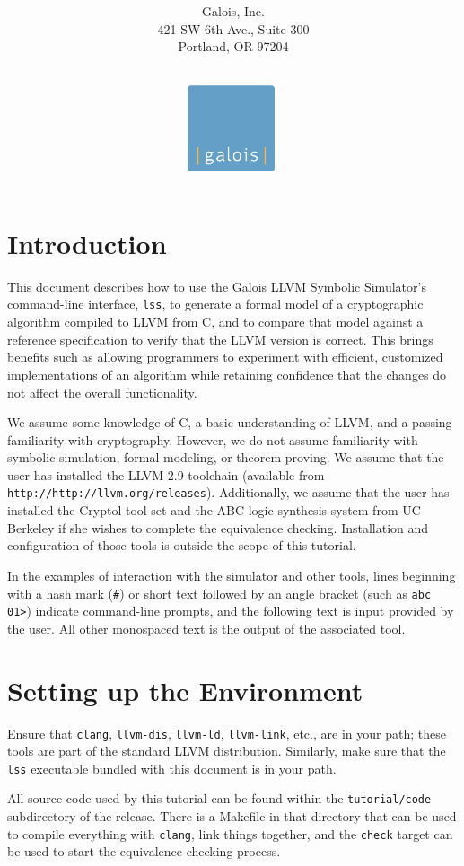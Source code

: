 \documentclass[11pt]{article}
\title{\LARGE{\bf \titleline}}
\author{\\$ $\\$ $\\
        Galois, Inc.\\
        421 SW 6th Ave., Suite 300\\Portland, OR 97204}
\date{
\vspace*{2cm}$ $\\
\includegraphics[height=1in]{images/Galois_logo_blue_box.pdf}
\vspace*{2cm}$ $\\
}
\begin{document}
\maketitle
\thispagestyle{empty}
\newpage

\section{Introduction}

This document describes how to use the Galois LLVM Symbolic Simulator's
command-line interface, \texttt{lss}, to generate a formal model of a
cryptographic algorithm compiled to LLVM from C, and to compare that
model against a reference specification to verify that the LLVM version
is correct. This brings benefits such as allowing programmers to
experiment with efficient, customized implementations of an algorithm
while retaining confidence that the changes do not affect the overall
functionality.

We assume some knowledge of C, a basic understanding of LLVM, and a
passing familiarity with cryptography. However, we do not assume
familiarity with symbolic simulation, formal modeling, or theorem
proving.  We assume that the user has installed the LLVM 2.9 toolchain
(available from \texttt{http://http://llvm.org/releases}).
Additionally, we assume that the user has installed the Cryptol tool set
and the ABC logic synthesis system from UC Berkeley if she wishes to
complete the equivalence checking.  Installation and configuration of
those tools is outside the scope of this tutorial.

In the examples of interaction with the simulator and other tools, lines
beginning with a hash mark (\texttt{\#}) or short text followed by an
angle bracket (such as \texttt{abc 01>}) indicate command-line prompts,
and the following text is input provided by the user. All other
monospaced text is the output of the associated tool.

\section{Setting up the Environment}
\label{sec:setup}
 
Ensure that \texttt{clang}, \texttt{llvm-dis}, \texttt{llvm-ld},
\texttt{llvm-link}, etc., are in your path; these tools are part of the
standard LLVM distribution.  Similarly, make sure that the \texttt{lss}
executable bundled with this document is in your path.

All source code used by this tutorial can be found within the
\texttt{tutorial/code} subdirectory of the release.  There is a Makefile
in that directory that can be used to compile everything with
\texttt{clang}, link things together, and the \texttt{check} target can
be used to start the equivalence checking process.
\end{document}
